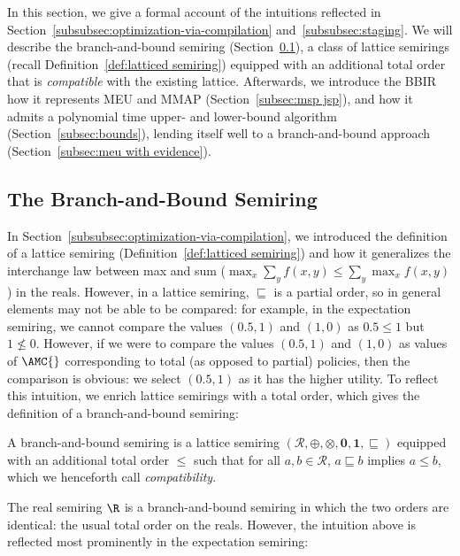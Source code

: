 In this section, we give a formal account of the intuitions
reflected in Section~\ref{subsubsec:optimization-via-compilation}
and~\cref{subsubsec:staging}.
We will describe the
branch-and-bound semiring (Section~\ref{subsec:bb semiring}),
a class of lattice semirings (recall Definition~\ref{def:latticed semiring})
equipped with an additional total order that is \textit{compatible} with the existing lattice.
Afterwards, we introduce the BBIR
how it represents MEU and MMAP
(Section~\ref{subsec:msp jsp}),
and how it admits a polynomial time upper- and lower-bound
algorithm (Section~\ref{subsec:bounds}),
lending itself well to a branch-and-bound
approach (Section~\ref{subsec:meu with evidence}).

\subsection{The Branch-and-Bound Semiring}
\label{subsec:bb semiring}

In Section~\ref{subsubsec:optimization-via-compilation},
we introduced the definition of a lattice semiring
(Definition~\ref{def:latticed semiring}) and how it generalizes the
interchange law between max and sum
($\max_{x} \sum_y f(x,y) \leq \sum_y \max_x f(x,y)$) in the reals.
However, in a lattice semiring,
$\sqsubseteq$ is a partial order, so in general elements may not be able to be compared:
for example, in the expectation semiring, we cannot compare the values $(0.5, 1)$ and $(1,0)$
as $0.5 \leq 1$ but $1 \not\leq 0$.
However, if we were to compare the values $(0.5, 1)$ and $(1,0)$ as
values of
$\AMC{}$ corresponding to total (as opposed to partial) policies,
then the comparison is
obvious: we select $(0.5, 1)$ as it has the higher utility.
To reflect this intuition, we enrich lattice semirings with a total order,
which gives the definition of a branch-and-bound semiring:

\begin{definition}\label{def:branch-and-bound semiring}
  A branch-and-bound semiring is a lattice semiring
  $(\mathcal R, \oplus, \otimes, \mathbf 0, \mathbf 1, \sqsubseteq)$
  equipped with an additional total order
  $\leq$ such that for all $a,b \in \mathcal R$,
  $a \sqsubseteq b$ implies $a \leq b$,
  which we henceforth call \emph{compatibility}.
\end{definition}

The real semiring $\R$ is a branch-and-bound semiring
in which the two orders are identical: the usual total order on the reals.
However, the intuition above is reflected most prominently in the expectation semiring:

